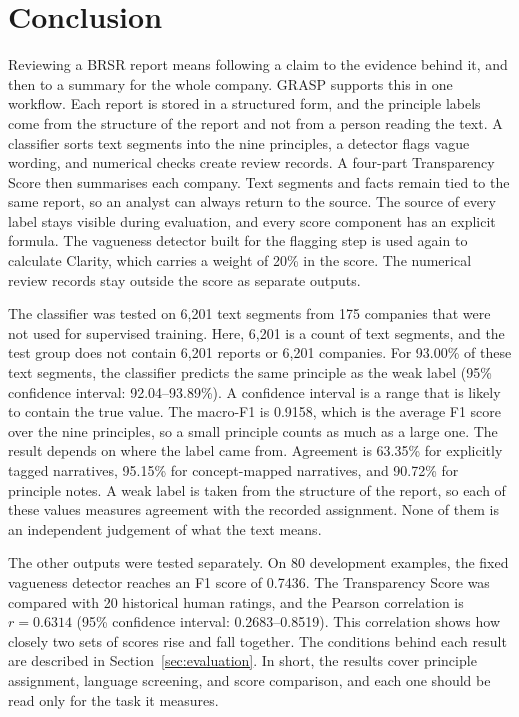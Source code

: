 \section{Conclusion}
\label{sec:conclusion}

Reviewing a BRSR report means following a claim to the evidence behind it, and then to a summary for the whole company. GRASP supports this in one workflow. Each report is stored in a structured form, and the principle labels come from the structure of the report and not from a person reading the text. A classifier sorts text segments into the nine principles, a detector flags vague wording, and numerical checks create review records. A four-part Transparency Score then summarises each company. Text segments and facts remain tied to the same report, so an analyst can always return to the source. The source of every label stays visible during evaluation, and every score component has an explicit formula. The vagueness detector built for the flagging step is used again to calculate Clarity, which carries a weight of 20\% in the score. The numerical review records stay outside the score as separate outputs.

The classifier was tested on 6,201 text segments from 175 companies that were not used for supervised training. Here, 6,201 is a count of text segments, and the test group does not contain 6,201 reports or 6,201 companies. For 93.00\% of these text segments, the classifier predicts the same principle as the weak label (95\% confidence interval: 92.04--93.89\%). A confidence interval is a range that is likely to contain the true value. The macro-F1 is 0.9158, which is the average F1 score over the nine principles, so a small principle counts as much as a large one. The result depends on where the label came from. Agreement is 63.35\% for explicitly tagged narratives, 95.15\% for concept-mapped narratives, and 90.72\% for principle notes. A weak label is taken from the structure of the report, so each of these values measures agreement with the recorded assignment. None of them is an independent judgement of what the text means.

The other outputs were tested separately. On 80 development examples, the fixed vagueness detector reaches an F1 score of 0.7436. The Transparency Score was compared with 20 historical human ratings, and the Pearson correlation is $r=0.6314$ (95\% confidence interval: 0.2683--0.8519). This correlation shows how closely two sets of scores rise and fall together. The conditions behind each result are described in Section~\ref{sec:evaluation}. In short, the results cover principle assignment, language screening, and score comparison, and each one should be read only for the task it measures.

